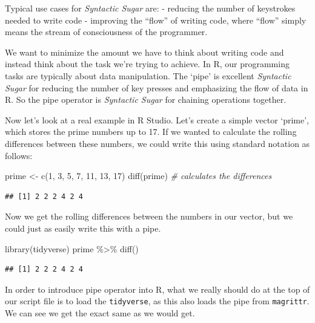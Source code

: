 \documentclass[
]{article}
\newenvironment{Shaded}{\begin{snugshade}}{\end{snugshade}}
\newcommand{\CommentTok}[1]{\textcolor[rgb]{0.56,0.35,0.01}{\textit{#1}}}
\newcommand{\DecValTok}[1]{\textcolor[rgb]{0.00,0.00,0.81}{#1}}
\newcommand{\FunctionTok}[1]{\textcolor[rgb]{0.00,0.00,0.00}{#1}}
\newcommand{\NormalTok}[1]{#1}
\newcommand{\OtherTok}[1]{\textcolor[rgb]{0.56,0.35,0.01}{#1}}
\newcommand{\SpecialCharTok}[1]{\textcolor[rgb]{0.00,0.00,0.00}{#1}}
\begin{document}
Typical use cases for \emph{Syntactic Sugar} are:
- reducing the number of keystrokes needed to write code
- improving the ``flow'' of writing code, where ``flow'' simply means the stream of consciousness of the programmer.

We want to minimize the amount we have to think about writing code and instead think about the task we're trying to achieve. In R, our programming tasks are typically about data manipulation. The `pipe' is excellent \emph{Syntactic Sugar} for reducing the number of key presses and emphasizing the flow of data in R. So the pipe operator is \emph{Syntactic Sugar} for chaining operations together.

Now let's look at a real example in R Studio. Let's create a simple vector `prime', which stores the prime numbers up to 17. If we wanted to calculate the rolling differences between these numbers, we could write this using standard notation as follows:

\begin{Shaded}
\begin{Highlighting}[]
\NormalTok{prime }\OtherTok{\textless{}{-}} \FunctionTok{c}\NormalTok{(}\DecValTok{1}\NormalTok{, }\DecValTok{3}\NormalTok{, }\DecValTok{5}\NormalTok{, }\DecValTok{7}\NormalTok{, }\DecValTok{11}\NormalTok{, }\DecValTok{13}\NormalTok{, }\DecValTok{17}\NormalTok{)}
\FunctionTok{diff}\NormalTok{(prime) }\CommentTok{\# calculates the differences}
\end{Highlighting}
\end{Shaded}

\begin{verbatim}
## [1] 2 2 2 4 2 4
\end{verbatim}

Now we get the rolling differences between the numbers in our vector, but we could just as easily write this with a pipe.

\begin{Shaded}
\begin{Highlighting}[]
\FunctionTok{library}\NormalTok{(tidyverse)}
\NormalTok{prime }\SpecialCharTok{\%\textgreater{}\%}
  \FunctionTok{diff}\NormalTok{()}
\end{Highlighting}
\end{Shaded}

\begin{verbatim}
## [1] 2 2 2 4 2 4
\end{verbatim}

In order to introduce pipe operator into R, what we really should do at the top of our script file is to load the \texttt{tidyverse}, as this also loads the pipe from \texttt{magrittr}. We can see we get the exact same as we would get.
\end{document}
